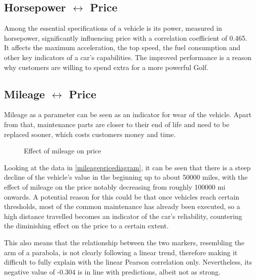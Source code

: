 \subsection{Horsepower $\leftrightarrow$ Price}
Among the essential specifications of a vehicle is its power, measured in horsepower, significantly influencing price with a correlation coefficient of 0.465.
It affects the maximum acceleration, the top speed, the fuel consumption and other key indicators of a car's capabilities.
The improved performance is a reason why customers are willing to spend extra for a more powerful Golf.
\subsection{Mileage $\leftrightarrow$ Price}
Mileage as a parameter can be seen as an indicator for wear of the vehicle.
Apart from that, maintenance parts are closer to their end of life and need to be replaced sooner,
which costs customers money and time.
\begin{figure}[H]
    \caption{Effect of mileage on price}
    \label{mileagepricediagram}
\end{figure}
Looking at the data in \autoref{mileagepricediagram}, it can be seen that there is a steep decline of the vehicle's value in the beginning up to about 50000 miles,
with the effect of mileage on the price notably decreasing from roughly 100000 mi onwards.
A potential reason for this could be that once vehicles reach certain thresholds, most of the common maintenance has already been executed, so
a high distance travelled becomes an indicator of the car's reliability, countering the diminishing effect on the price to a certain extent.
\par
This also means that the relationship between the two markers, resembling the arm of a parabola, is not clearly following a linear trend, therefore making it difficult to fully explain with
the linear Pearson correlation only.
Nevertheless, its negative value of -0.304 is in line with predictions, albeit not as strong.

